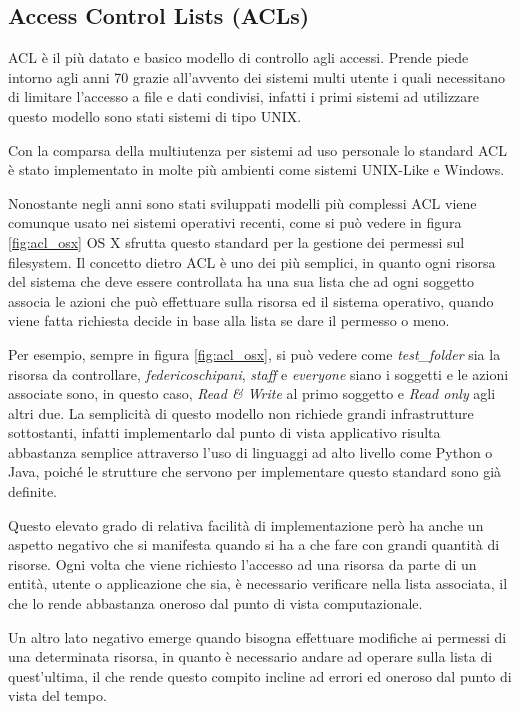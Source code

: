 \subsection*{Access Control Lists (ACLs)}
\label{sub:ACL}

ACL è il più datato e basico modello di controllo agli accessi. Prende piede intorno agli anni 70
grazie all'avvento dei sistemi multi utente i quali necessitano di limitare l'accesso a file e dati condivisi, infatti i primi sistemi ad utilizzare questo modello sono stati sistemi di tipo UNIX. \par
Con la comparsa della multiutenza per sistemi ad uso personale lo standard ACL è stato implementato in molte più ambienti come sistemi UNIX-Like e Windows. \par
Nonostante negli anni sono stati sviluppati modelli più complessi ACL viene comunque usato nei sistemi operativi recenti, come si può vedere in figura \ref{fig:acl_osx} OS X sfrutta questo standard per la gestione dei permessi sul filesystem.
Il concetto dietro ACL è uno dei più semplici, in quanto ogni risorsa del sistema che deve essere controllata ha una sua lista che ad ogni soggetto associa le azioni che può effettuare sulla risorsa ed il sistema operativo, quando viene fatta richiesta decide in base alla lista se dare il permesso o meno. \\ \par
Per esempio, sempre in figura \ref{fig:acl_osx}, si può vedere come \textit{test\_folder} sia la risorsa da controllare, \textit{federicoschipani}, \textit{staff} e \textit{everyone} siano i soggetti e le azioni associate sono, in questo caso, \textit{Read \& Write} al primo soggetto e \textit{Read only} agli altri due.
La semplicità di questo modello non richiede grandi infrastrutture sottostanti, infatti implementarlo dal punto di vista applicativo risulta abbastanza semplice attraverso l'uso di linguaggi ad alto livello come Python o Java, poiché le strutture che servono per implementare questo standard sono già definite. \par
Questo elevato grado di relativa facilità di implementazione però ha anche un aspetto negativo che si manifesta quando si ha a che fare con grandi quantità di risorse. Ogni volta che viene richiesto l'accesso ad una risorsa da parte di un entità, utente o applicazione che sia, è necessario verificare nella lista associata, il che lo rende abbastanza oneroso dal punto di vista computazionale.\\ \par
Un altro lato negativo emerge quando bisogna effettuare modifiche ai permessi di una determinata risorsa, in quanto è necessario andare ad operare sulla lista di quest'ultima, il che rende questo compito incline ad errori ed oneroso dal punto di vista del tempo.



